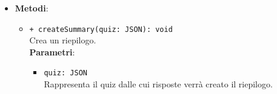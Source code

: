 \begin{itemize}
\begin{itemize}
\begin{itemize}
				\end{itemize}
		\end{itemize}
	\item \textbf{Metodi}:
		\begin{itemize}
			\item \texttt{+ createSummary(quiz: JSON): void}\\
			Crea un riepilogo.\\
			\textbf{Parametri}:
			\begin{itemize}
				\item \texttt{quiz: JSON}\\
				Rappresenta il quiz dalle cui risposte verrà creato il riepilogo.
			\end{itemize}
		\end{itemize}
\end{itemize}